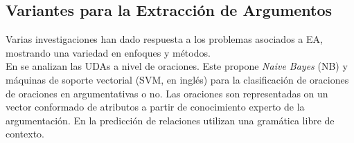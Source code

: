 \documentclass[a4paper,11pt,twocolumn,twoside]{article}
\begin{document}




\subsection{Variantes para la Extracción de Argumentos}

Varias investigaciones han dado respuesta a los problemas asociados a EA, mostrando
una variedad en enfoques y métodos.\\

En \cite{palau2009argumentation} se analizan las UDAs a nivel de oraciones.
Este propone \textit{Naive Bayes} (NB) y máquinas de soporte vectorial (SVM, en inglés) para la clasificación
de oraciones de oraciones en argumentativas o no. Las oraciones son representadas
on un vector conformado de atributos a partir de conocimiento experto de la argumentación. En
la predicción de relaciones utilizan una gramática libre de contexto.

\end{document}
